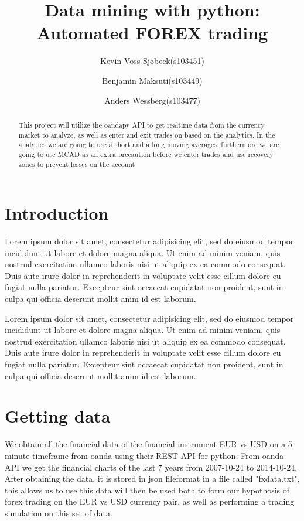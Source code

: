 \documentclass[10pt]{IEEEtran}
\title{Data mining with python: \\Automated FOREX trading}
\author{
	Kevin Voss Sjøbeck(s103451)\\
	\and
	Benjamin Maksuti(s103449)\\
	\and
	Anders Wessberg(s103477)
}
\begin{document}
\maketitle

\begin{abstract}
This project will utilize the oandapy API to get realtime data from the currency market to analyze, as well as enter and exit trades on based on the analytics. In the analytics we are going to use a short and a long moving averages, furthermore we are going to use MCAD as an extra precaution before we enter trades and use recovery zones to prevent losses on the account
\end{abstract}

\section{Introduction}

Lorem ipsum dolor sit amet, consectetur adipisicing elit, sed do
eiusmod tempor incididunt ut labore et dolore magna aliqua. Ut enim ad
minim veniam, quis nostrud exercitation ullamco laboris nisi ut
aliquip ex ea commodo consequat. Duis aute irure dolor in
reprehenderit in voluptate velit esse cillum dolore eu fugiat nulla
pariatur. Excepteur sint occaecat cupidatat non proident, sunt in
culpa qui officia deserunt mollit anim id est laborum. 

Lorem ipsum dolor sit amet, consectetur adipisicing elit, sed do
eiusmod tempor incididunt ut labore et dolore magna aliqua. Ut enim ad
minim veniam, quis nostrud exercitation ullamco laboris nisi ut
aliquip ex ea commodo consequat. Duis aute irure dolor in
reprehenderit in voluptate velit esse cillum dolore eu fugiat nulla
pariatur. Excepteur sint occaecat cupidatat non proident, sunt in
culpa qui officia deserunt mollit anim id est laborum.


\section{Getting data}
We obtain all the financial data of the financial instrument EUR vs USD on a 5 minute timeframe from oanda using their REST API for python. From oanda API we get the financial charts of the last 7 years from 2007-10-24 to 2014-10-24. After obtaining the data, it is stored in json fileformat in a file called "fxdata.txt", this allows us to use this data will then be used both to form our hypothosis of forex trading on the EUR vs USD currency pair, as well as performing a trading simulation on this set of data.
\end{document}
